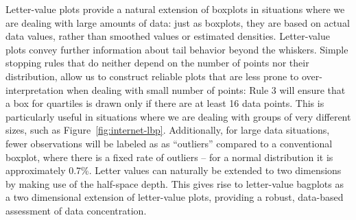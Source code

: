 \documentclass[oneside]{article}
\begin{document}
Letter-value plots provide a natural extension of boxplots in situations where we are dealing with large amounts of data: just as boxplots, they are based on actual data values, rather than smoothed values or estimated densities. Letter-value plots convey further information about tail behavior beyond the whiskers. Simple stopping rules that do neither depend on the number of points nor their distribution, allow us to construct reliable plots that are less prone to over-interpretation when dealing with small number of points: Rule 3 will ensure that a box for quartiles is drawn only if there are at least 16 data points. This is particularly useful in situations where we are dealing with groups of very different sizes, such as Figure~\ref{fig:internet-lbp}. Additionally, for large data situations, fewer observations will be labeled as as ``outliers'' compared to a conventional boxplot, where there is a fixed rate of outliers -- for a normal distribution it is approximately 0.7\%. Letter values can naturally be extended to two dimensions by making use of the half-space depth. This gives rise to letter-value bagplots as a two dimensional extension of letter-value plots, providing a robust, data-based assessment of data concentration.

%
\end{document}
